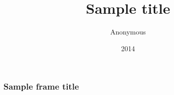 \documentclass{beamer}
\title{Sample title}
\author{Anonymous}
\institute{Overleaf}
\date{2014}
\begin{document}
\frame{\titlepage}

\begin{frame}
\frametitle{Sample frame title}
\blindtext
\end{frame}
\end{document}
